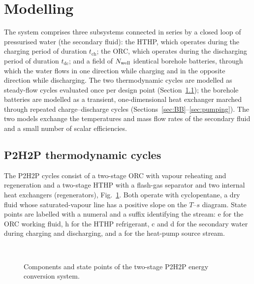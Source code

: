 \section{Modelling}
\label{sec:model}

The system comprises three subsystems connected in series by a closed loop of
pressurised water (the secondary fluid): the HTHP, which operates during the
charging period of duration $t_\mathrm{ch}$; the ORC, which operates during
the discharging period of duration $t_\mathrm{dc}$; and a field of $N_{\mathrm{well}}$
identical borehole batteries, through which the water flows in one direction
while charging and in the opposite direction while discharging. The two
thermodynamic cycles are modelled as steady-flow cycles evaluated once per
design point (Section~\ref{sec:cycles}); the borehole batteries are modelled
as a transient, one-dimensional heat exchanger marched through repeated
charge--discharge cycles (Sections~\ref{sec:BB}--\ref{sec:pumping}). The two
models exchange the temperatures and mass flow rates of the secondary fluid
and a small number of scalar efficiencies.

\subsection{P2H2P thermodynamic cycles}
\label{sec:cycles}

The P2H2P cycles consist of a two-stage ORC with vapour reheating and
regeneration and a two-stage HTHP with a flash-gas separator and two
internal heat exchangers (regenerators), Fig.~\ref{fig:layout}. Both operate
with cyclopentane, a dry fluid whose saturated-vapour line has a positive
slope on the $T$--$s$ diagram. State points are labelled with a numeral and a
suffix identifying the stream: \textsf{e} for the ORC working fluid,
\textsf{h} for the HTHP refrigerant, \textsf{c} and \textsf{d} for the
secondary water during charging and discharging, and \textsf{a} for the
heat-pump source stream.

\begin{figure}[htbp]
  \centering
  \begin{subfigure}{0.85\linewidth}\centering
  \end{subfigure}\\[4pt]
  \begin{subfigure}{0.85\linewidth}\centering
  \end{subfigure}
  \caption{Components and state points of the two-stage P2H2P energy
  conversion system. }
  \label{fig:layout}
\end{figure}

